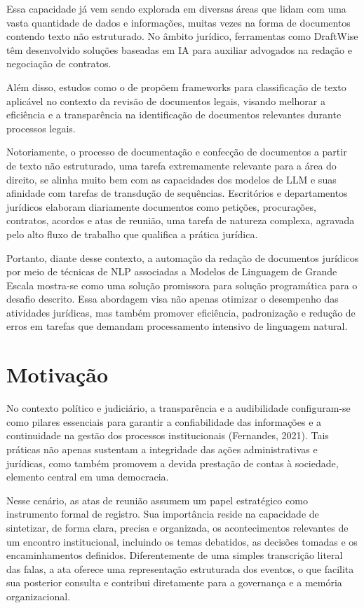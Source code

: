 Essa capacidade já vem sendo explorada em diversas áreas que lidam com uma vasta quantidade de dados e informações, muitas vezes na forma de documentos contendo texto não estruturado. No âmbito jurídico, ferramentas como DraftWise têm desenvolvido soluções baseadas em IA para auxiliar advogados na redação e negociação de contratos.

Além disso, estudos como o de  propõem frameworks para classificação de texto aplicável no contexto da revisão de documentos legais, visando melhorar a eficiência e a transparência na identificação de documentos relevantes durante processos legais.   

Notoriamente, o processo de documentação e confecção de documentos a partir de texto não estruturado, uma tarefa extremamente relevante para a área do direito, se alinha muito bem com as capacidades dos modelos de LLM e suas afinidade com tarefas de transdução de sequências. Escritórios e departamentos jurídicos elaboram diariamente documentos como petições, procurações, contratos, acordos e atas de reunião, uma tarefa de natureza complexa, agravada pelo alto fluxo de trabalho que qualifica a prática jurídica.

Portanto, diante desse contexto, a automação da redação de documentos jurídicos por meio de técnicas de NLP associadas a Modelos de Linguagem de Grande Escala mostra-se como uma solução promissora para solução programática para o desafio descrito. Essa abordagem visa não apenas otimizar o desempenho das atividades jurídicas, mas também promover eficiência, padronização e redução de erros em tarefas que demandam processamento intensivo de linguagem natural.  

\section{Motivação}
\label{sec:motivacao}

No contexto político e judiciário, a transparência e a audibilidade configuram-se como pilares essenciais para garantir a confiabilidade das informações e a continuidade na gestão dos processos institucionais (Fernandes, 2021). Tais práticas não apenas sustentam a integridade das ações administrativas e jurídicas, como também promovem a devida prestação de contas à sociedade, elemento central em uma democracia.

Nesse cenário, as atas de reunião assumem um papel estratégico como instrumento formal de registro. Sua importância reside na capacidade de sintetizar, de forma clara, precisa e organizada, os acontecimentos relevantes de um encontro institucional, incluindo os temas debatidos, as decisões tomadas e os encaminhamentos definidos. Diferentemente de uma simples transcrição literal das falas, a ata oferece uma representação estruturada dos eventos, o que facilita sua posterior consulta e contribui diretamente para a governança e a memória organizacional.

